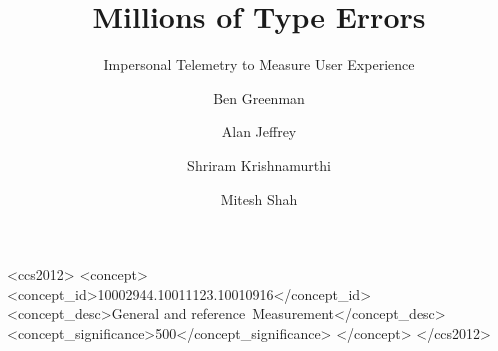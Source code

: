 \documentclass[english,submission,cleveref]{programming}
\begin{document}
\title{Millions of Type Errors}
\subtitle{Impersonal Telemetry to Measure User Experience}


\author[a]{Ben Greenman}

\author[b]{Alan Jeffrey}

\author[a]{Shriram Krishnamurthi}

\author[b]{Mitesh Shah}


\newcommand{\code}[1]{\texttt{#1}}
\newcommand{\FILL}{\textbf{FILL}}
\newcommand{\dotscale}[1]{\scalebox{0.72}{#1}}
\newcommand{\wideas}[2]{\makebox[\widthof{#2}][l]{#1}}
\newcommand{\twoline}[2]{\parbox[s]{1.4cm}{\flushleft#1\newline#2}}
\newcommand{\chkYes}{\dotscale{\CIRCLE}}
\newcommand{\chkMaybe}{\wideas{\dotscale{\Circle}}{\chkYes}}
\newcommand{\chkNo}{\wideas{}{\chkYes}}
\newcommand{\pct}[1]{\SI{#1}{\percent}}
\newcommand{\modefont}[1]{\texttt{#1}}
\newcommand{\mnocheck}{\modefont{nocheck}}
\newcommand{\mnonstrict}{\modefont{nonstrict}}
\newcommand{\mstrict}{\modefont{strict}}
\newcommand{\zerowidth}[1]{\makebox[0pt][l]{#1}}
\newcommand{\stddev}[1]{[#1\textsc{k}]}
\newcommand{\gcell}[1]{\cellcolor{green!20}#1}
\newcommand{\ycell}[1]{\cellcolor{yellow!18}#1}
\newcommand{\ocell}[1]{\cellcolor{orange!29}#1}
\newcommand{\rcell}[1]{\cellcolor{red!30}$\!\!$#1$\!\!$}


\begin{CCSXML}
<ccs2012>
<concept>
<concept_id>10002944.10011123.10010916</concept_id>
<concept_desc>General and reference~Measurement</concept_desc>
<concept_significance>500</concept_significance>
</concept>
</ccs2012>
\end{CCSXML}
\end{document}
